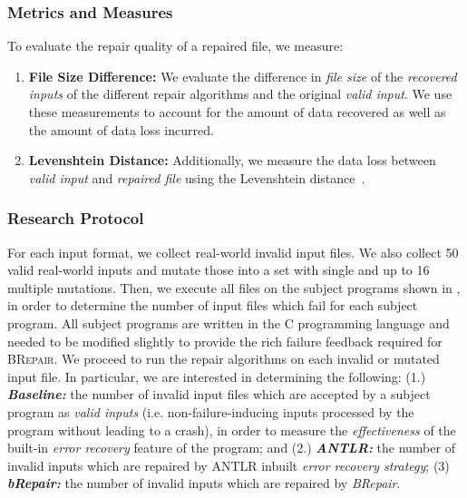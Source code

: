 \documentclass[sigconf,review,anonymous]{acmart}
\newcommand{\approach}{\textsc{BRepair}\xspace}
\newcommand{\brepair}{\textit{BRepair}\xspace}
\begin{document}
\subsubsection*{\bf Metrics and Measures}
To evaluate the repair quality of a repaired file, we measure:
\begin{enumerate}
    \item \textbf{File Size Difference: } We evaluate the difference in \textit{file size} of the \emph{recovered inputs} of the different repair algorithms and the original \textit{valid input}.
    We use these measurements to account for the amount of data recovered as well as the amount of data loss incurred.
\item \textbf{Levenshtein Distance: } Additionally, we measure the data loss between \textit{valid input} and \textit{repaired file} using the Levenshtein distance~\cite{levDistance}.
\end{enumerate}

\subsubsection*{\bf Research Protocol}
For each input format, we collect real-world invalid input files.
We also collect 50 valid real-world inputs and mutate those into a set with single and up to 16 multiple mutations.
Then, we execute all files on the subject programs shown in , in order to determine the number of input files which fail for each subject program.
All subject programs are written in the C programming language and needed to be modified slightly to provide the rich failure feedback required for \approach.
We proceed to run the repair algorithms on each invalid or mutated input file.
In particular, we are interested in determining the following:
(1.) \textit{\textbf{Baseline:}} the number of invalid input files which are accepted by a subject program as \textit{valid inputs} (i.e. non-failure-inducing inputs processed by the program without leading to a crash), in order to measure the \textit{effectiveness} of the built-in \textit{error recovery} feature of the program;  and
(2.) \textit{\textbf{ANTLR:}} the number of invalid inputs which are repaired by ANTLR inbuilt \textit{error recovery strategy};
(3) \textit{\textbf{bRepair:}} the number of invalid inputs which are repaired by \brepair.
\end{document}
